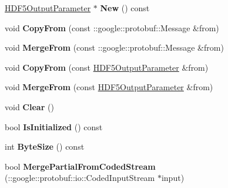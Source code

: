 \begin{DoxyCompactItemize}
\mbox{\hyperlink{classcaffe_1_1_h_d_f5_output_parameter}{H\+D\+F5\+Output\+Parameter}} $\ast$ {\bfseries New} () const
\item 
\mbox{\label{classcaffe_1_1_h_d_f5_output_parameter_a82975052e4eaf03817423d6419560f6b}} 
void {\bfseries Copy\+From} (const \+::google\+::protobuf\+::\+Message \&from)
\item 
\mbox{\label{classcaffe_1_1_h_d_f5_output_parameter_a1e0c07ab77fa846439224b3fca0a46a8}} 
void {\bfseries Merge\+From} (const \+::google\+::protobuf\+::\+Message \&from)
\item 
\mbox{\label{classcaffe_1_1_h_d_f5_output_parameter_a7af9022e2e32467b8baf736470446e15}} 
void {\bfseries Copy\+From} (const \mbox{\hyperlink{classcaffe_1_1_h_d_f5_output_parameter}{H\+D\+F5\+Output\+Parameter}} \&from)
\item 
\mbox{\label{classcaffe_1_1_h_d_f5_output_parameter_a58bb39b6b416af44d76901b721de0487}} 
void {\bfseries Merge\+From} (const \mbox{\hyperlink{classcaffe_1_1_h_d_f5_output_parameter}{H\+D\+F5\+Output\+Parameter}} \&from)
\item 
\mbox{\label{classcaffe_1_1_h_d_f5_output_parameter_a5443f1d939da1e3a7474215f0996bb52}} 
void {\bfseries Clear} ()
\item 
\mbox{\label{classcaffe_1_1_h_d_f5_output_parameter_ac3d59007dfe9fea43bcd7b96463aa0dc}} 
bool {\bfseries Is\+Initialized} () const
\item 
\mbox{\label{classcaffe_1_1_h_d_f5_output_parameter_ad028dfe38b9051f310227ed2332f9ed4}} 
int {\bfseries Byte\+Size} () const
\item 
\mbox{\label{classcaffe_1_1_h_d_f5_output_parameter_ae842a12b8a464cec79cdd9646c8d0cf8}} 
bool {\bfseries Merge\+Partial\+From\+Coded\+Stream} (\+::google\+::protobuf\+::io\+::\+Coded\+Input\+Stream $\ast$input)
\item 
\mbox{\label{classcaffe_1_1_h_d_f5_output_parameter_a84fb51b4a89728d3ecbccbcd21365184}} 

\end{DoxyCompactItemize}
